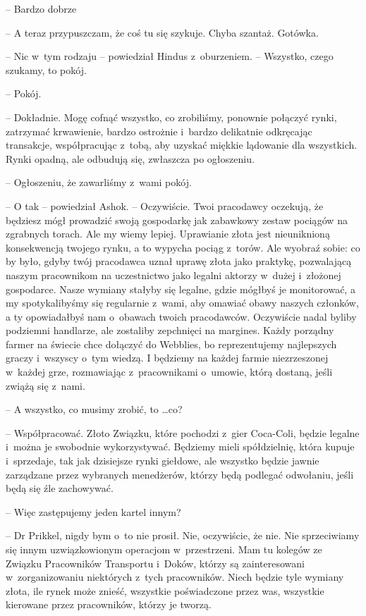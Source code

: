 \documentclass[oneside,polish,11pt,rmheadings]{mwbk}
\begin{document}
-- Bardzo dobrze

-- A teraz przypuszczam, że coś tu się szykuje. Chyba szantaż. Gotówka.

-- Nic w~tym rodzaju -- powiedział Hindus z~oburzeniem. -- Wszystko, czego szukamy, to pokój.

-- Pokój. 

-- Dokładnie. Mogę cofnąć wszystko, co zrobiliśmy, ponownie połączyć rynki, zatrzymać krwawienie, bardzo ostrożnie i~bardzo delikatnie odkręcając transakcje, współpracując z~tobą, aby uzyskać miękkie lądowanie dla wszystkich. Rynki opadną, ale odbudują się, zwłaszcza po ogłoszeniu.

-- Ogłoszeniu, że zawarliśmy z~wami pokój.

-- O tak -- powiedział Ashok. -- Oczywiście. Twoi pracodawcy oczekują, że będziesz mógł prowadzić swoją gospodarkę jak zabawkowy zestaw pociągów na zgrabnych torach. Ale my wiemy lepiej. Uprawianie złota jest nieuniknioną konsekwencją twojego rynku, a to wypycha pociąg z~torów. Ale wyobraź sobie: co by było, gdyby twój pracodawca uznał uprawę złota jako praktykę, pozwalającą naszym pracownikom na uczestnictwo jako legalni aktorzy w~dużej i~złożonej gospodarce. Nasze wymiany stałyby się legalne, gdzie mógłbyś je monitorować, a my spotykalibyśmy się regularnie z~wami, aby omawiać obawy naszych członków, a ty opowiadałbyś nam o~obawach twoich pracodawców. Oczywiście nadal byliby podziemni handlarze, ale zostaliby zepchnięci na margines. Każdy porządny farmer na świecie chce dołączyć do Webblies, bo reprezentujemy najlepszych graczy i~wszyscy o~tym wiedzą. I będziemy na każdej farmie niezrzeszonej w~każdej grze, rozmawiając z~pracownikami o~umowie, którą dostaną, jeśli zwiążą się z~nami.

-- A wszystko, co musimy zrobić, to \ldots  co?

-- Współpracować. Złoto Związku, które pochodzi z~gier Coca-Coli, będzie legalne i~można je swobodnie wykorzystywać. Będziemy mieli spółdzielnię, która kupuje i~sprzedaje, tak jak dzisiejsze rynki giełdowe, ale wszystko będzie jawnie zarządzane przez wybranych menedżerów, którzy będą podlegać odwołaniu, jeśli będą się źle zachowywać. 

-- Więc zastępujemy jeden kartel innym?

-- Dr Prikkel, nigdy bym o~to nie prosił. Nie, oczywiście, że nie. Nie sprzeciwiamy się innym uzwiązkowionym operacjom w~przestrzeni. Mam tu kolegów ze Związku Pracowników Transportu i~Doków, którzy są zainteresowani w~zorganizowaniu niektórych z~tych pracowników. Niech będzie tyle wymiany złota, ile rynek może znieść, wszystkie poświadczone przez was, wszystkie kierowane przez pracowników, którzy je tworzą.
\end{document}
